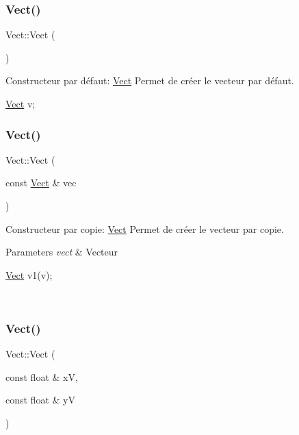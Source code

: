 \subsubsection{\texorpdfstring{Vect()}{Vect()}\hspace{0.1cm}{\footnotesize\ttfamily [1/3]}}
{\footnotesize\ttfamily Vect\+::\+Vect (\begin{DoxyParamCaption}{ }\end{DoxyParamCaption})}



Constructeur par défaut\+: \hyperlink{classVect}{Vect} Permet de créer le vecteur par défaut. 


\begin{DoxyCode}
\hyperlink{classVect}{Vect} v;
\end{DoxyCode}
 \mbox{\label{classVect_af8a503f3e10b3ec27582e47fbbf3c66f}} 
\subsubsection{\texorpdfstring{Vect()}{Vect()}\hspace{0.1cm}{\footnotesize\ttfamily [2/3]}}
{\footnotesize\ttfamily Vect\+::\+Vect (\begin{DoxyParamCaption}\item[{const \hyperlink{classVect}{Vect} \&}]{vec }\end{DoxyParamCaption})}



Constructeur par copie\+: \hyperlink{classVect}{Vect} Permet de créer le vecteur par copie. 


\begin{DoxyParams}{Parameters}
{\em vect} & Vecteur 
\begin{DoxyCode}
\hyperlink{classVect}{Vect} v1(v);
\end{DoxyCode}
 \\
\hline
\end{DoxyParams}
\mbox{\label{classVect_a12b53ecc7a5ba733c85bacc1c6deac28}} 
\subsubsection{\texorpdfstring{Vect()}{Vect()}\hspace{0.1cm}{\footnotesize\ttfamily [3/3]}}
{\footnotesize\ttfamily Vect\+::\+Vect (\begin{DoxyParamCaption}\item[{const float \&}]{xV,  }\item[{const float \&}]{yV }\end{DoxyParamCaption})}



